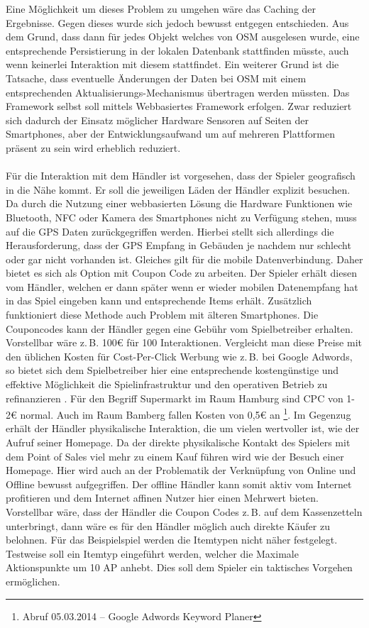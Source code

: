 Eine Möglichkeit um dieses Problem zu umgehen wäre das Caching der Ergebnisse. Gegen dieses wurde sich jedoch bewusst entgegen entschieden. Aus dem Grund, dass dann für jedes Objekt welches von OSM ausgelesen wurde, eine entsprechende Persistierung in der lokalen Datenbank stattfinden müsste, auch wenn keinerlei Interaktion mit diesem stattfindet. Ein weiterer Grund ist die Tatsache, dass eventuelle Änderungen der Daten bei OSM mit einem entsprechenden Aktualisierungs-Mechanismus übertragen werden müssten.
Das Framework selbst soll mittels Webbasiertes Framework erfolgen.
Zwar reduziert sich dadurch der Einsatz möglicher Hardware Sensoren auf Seiten der Smartphones, aber der Entwicklungsaufwand um auf mehreren Plattformen präsent zu sein wird erheblich reduziert.
\\\\
Für die Interaktion mit dem Händler ist vorgesehen, dass der Spieler geografisch in die Nähe kommt. Er soll die jeweiligen Läden der Händler explizit besuchen. Da durch die Nutzung einer webbasierten Lösung die Hardware Funktionen wie Bluetooth, NFC oder Kamera des Smartphones nicht zu Verfügung stehen, muss auf die GPS Daten zurückgegriffen werden.
Hierbei stellt sich allerdings die Herausforderung, dass der GPS Empfang in Gebäuden je nachdem nur schlecht oder gar nicht vorhanden ist. Gleiches gilt für die mobile Datenverbindung. Daher bietet es sich als Option mit Coupon Code zu arbeiten. Der Spieler erhält diesen vom Händler, welchen er dann später wenn er wieder mobilen Datenempfang hat in das Spiel eingeben kann und entsprechende Items erhält. Zusätzlich funktioniert diese Methode auch Problem mit älteren Smartphones. Die Couponcodes kann der Händler gegen eine Gebühr vom Spielbetreiber erhalten. Vorstellbar wäre z.\,B. 100€ für 100 Interaktionen. Vergleicht man diese Preise mit den üblichen Kosten für Cost-Per-Click Werbung wie z.\,B. bei Google Adwords, so bietet sich dem Spielbetreiber hier eine entsprechende kostengünstige und effektive Möglichkeit die Spielinfrastruktur und den operativen Betrieb zu refinanzieren \cite{Guerini.2010}. Für den Begriff Supermarkt im Raum Hamburg sind CPC von 1-2€ normal. Auch im Raum Bamberg fallen Kosten von 0,5€ an \footnote{Abruf 05.03.2014 -- Google Adwords Keyword Planer}. Im Gegenzug erhält der Händler physikalische Interaktion, die um vielen wertvoller ist, wie der Aufruf seiner Homepage. Da der direkte physikalische Kontakt des Spielers mit dem Point of Sales viel mehr zu einem Kauf führen wird wie der Besuch einer Homepage. Hier wird auch an der Problematik der Verknüpfung von Online und Offline bewusst aufgegriffen. Der offline Händler kann somit aktiv vom Internet profitieren und dem Internet affinen Nutzer hier einen Mehrwert bieten. Vorstellbar wäre, dass der Händler die Coupon Codes z.\,B. auf dem Kassenzetteln unterbringt, dann wäre es für den Händler möglich auch direkte Käufer zu belohnen.
Für das Beispielspiel werden die Itemtypen nicht näher festgelegt. Testweise soll ein Itemtyp eingeführt werden, welcher die Maximale Aktionspunkte um 10 AP anhebt. Dies soll dem Spieler ein taktisches Vorgehen ermöglichen.
